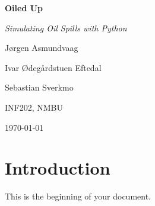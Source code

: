 \documentclass[a4paper,12pt]{article}
\begin{document}
\begin{titlepage}
    \centering
    \vspace*{2cm} %
    {\Huge\bfseries Oiled Up \par} %
    \vspace{0.5cm}
    {\Large\itshape Simulating Oil Spills with Python \par} %
    \vspace{2cm}
    {\Large Jørgen Asmundvaag \par} %
    {\Large Ivar Ødegårdstuen Eftedal \par} %
    {\Large Sebastian Sverkmo \par} 
    \vspace{1cm}
    {\large INF202, NMBU \par} %
    \vfill
    {\large \today} %
    \vspace*{1cm}
\end{titlepage}

\section*{Introduction}
This is the beginning of your document.
\end{document}
